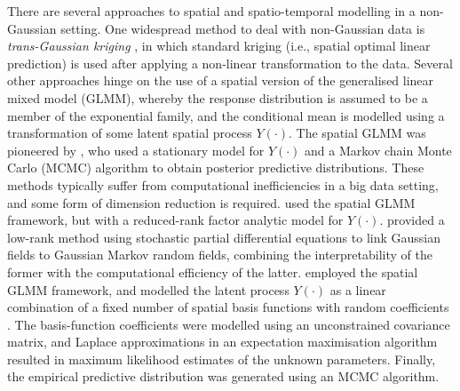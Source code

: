 \documentclass[article]{jss}
\begin{document}
There are several approaches to spatial and spatio-temporal modelling in a non-Gaussian setting.
One widespread method to deal with non-Gaussian data is \textit{trans-Gaussian kriging} \citep[pg.~137--138]{Cressie_1993_stats_for_spatial_data}, in which standard kriging (i.e., spatial optimal linear prediction) is used after applying a non-linear transformation to the data. %
 Several other approaches hinge on the use of a spatial version of the generalised linear mixed model (GLMM), whereby the response distribution is assumed to be a member of the exponential family, and the conditional mean is modelled using a transformation of some latent spatial process $Y(\cdot)$. 
  The spatial GLMM was pioneered by \cite{Diggle_1998_spatial_GLMM}, who used a stationary model for $Y(\cdot)$ and a Markov chain Monte Carlo (MCMC) algorithm to obtain posterior predictive distributions. 
These methods typically suffer from computational inefficiencies in a big data setting, and some form of dimension reduction is required. 
\cite{Lopes_2011_spatial_GLMM_reduced_rank_factor_analytic_model} used the spatial GLMM framework, but with a reduced-rank factor analytic model for $Y(\cdot)$. 
\cite{Lindgren_Rue_2011_GF_GMRF_SPDE} provided a low-rank method using stochastic partial differential equations to link Gaussian fields to Gaussian Markov random fields, combining the interpretability of the former with the computational efficiency of the latter. 
\cite{Sengupta_Cressie_2013_spatial_GLMM_FRK} employed the spatial GLMM framework, and modelled the latent process $Y(\cdot)$ as a linear combination of a fixed number of spatial basis functions with random coefficients \citep{Cressie_Johannesson_2008_FRK}. The basis-function coefficients were modelled using an unconstrained covariance matrix, and Laplace approximations in an expectation maximisation algorithm resulted in maximum likelihood estimates of the unknown parameters. Finally, the empirical predictive distribution was generated using an MCMC algorithm.
\end{document}

